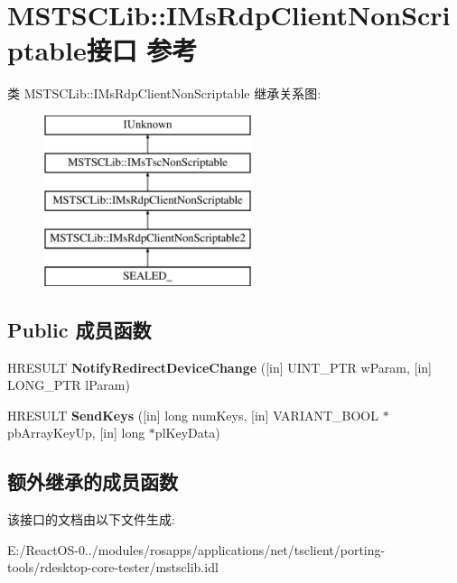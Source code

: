 \hypertarget{interface_m_s_t_s_c_lib_1_1_i_ms_rdp_client_non_scriptable}{}\section{M\+S\+T\+S\+C\+Lib\+:\+:I\+Ms\+Rdp\+Client\+Non\+Scriptable接口 参考}
\label{interface_m_s_t_s_c_lib_1_1_i_ms_rdp_client_non_scriptable}
类 M\+S\+T\+S\+C\+Lib\+:\+:I\+Ms\+Rdp\+Client\+Non\+Scriptable 继承关系图\+:\begin{figure}[H]
\begin{center}
\leavevmode
\includegraphics[height=5.000000cm]{interface_m_s_t_s_c_lib_1_1_i_ms_rdp_client_non_scriptable}
\end{center}
\end{figure}
\subsection*{Public 成员函数}
\begin{DoxyCompactItemize}
\item 
\mbox{\label{interface_m_s_t_s_c_lib_1_1_i_ms_rdp_client_non_scriptable_aeede87ba9cdccba385c88afc6e34c95b}} 
H\+R\+E\+S\+U\+LT {\bfseries Notify\+Redirect\+Device\+Change} (\mbox{[}in\mbox{]} U\+I\+N\+T\+\_\+\+P\+TR w\+Param, \mbox{[}in\mbox{]} L\+O\+N\+G\+\_\+\+P\+TR l\+Param)
\item 
\mbox{\label{interface_m_s_t_s_c_lib_1_1_i_ms_rdp_client_non_scriptable_a5dbadb5c365c6f9998bc9668897bcb34}} 
H\+R\+E\+S\+U\+LT {\bfseries Send\+Keys} (\mbox{[}in\mbox{]} long num\+Keys, \mbox{[}in\mbox{]} V\+A\+R\+I\+A\+N\+T\+\_\+\+B\+O\+OL $\ast$pb\+Array\+Key\+Up, \mbox{[}in\mbox{]} long $\ast$pl\+Key\+Data)
\end{DoxyCompactItemize}
\subsection*{额外继承的成员函数}


该接口的文档由以下文件生成\+:\begin{DoxyCompactItemize}
\item 
E\+:/\+React\+O\+S-\/0../modules/rosapps/applications/net/tsclient/porting-\/tools/rdesktop-\/core-\/tester/mstsclib.\+idl\end{DoxyCompactItemize}
